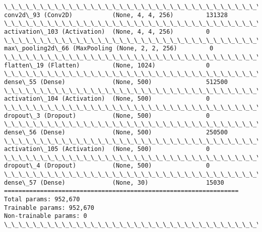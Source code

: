 \documentclass[11pt]{article}
\begin{document}
\begin{Verbatim}[commandchars=\\\{\}]
\_\_\_\_\_\_\_\_\_\_\_\_\_\_\_\_\_\_\_\_\_\_\_\_\_\_\_\_\_\_\_\_\_\_\_\_\_\_\_\_\_\_\_\_\_\_\_\_\_\_\_\_\_\_\_\_\_\_\_\_\_\_\_\_\_
conv2d\_93 (Conv2D)           (None, 4, 4, 256)         131328    
\_\_\_\_\_\_\_\_\_\_\_\_\_\_\_\_\_\_\_\_\_\_\_\_\_\_\_\_\_\_\_\_\_\_\_\_\_\_\_\_\_\_\_\_\_\_\_\_\_\_\_\_\_\_\_\_\_\_\_\_\_\_\_\_\_
activation\_103 (Activation)  (None, 4, 4, 256)         0         
\_\_\_\_\_\_\_\_\_\_\_\_\_\_\_\_\_\_\_\_\_\_\_\_\_\_\_\_\_\_\_\_\_\_\_\_\_\_\_\_\_\_\_\_\_\_\_\_\_\_\_\_\_\_\_\_\_\_\_\_\_\_\_\_\_
max\_pooling2d\_66 (MaxPooling (None, 2, 2, 256)         0         
\_\_\_\_\_\_\_\_\_\_\_\_\_\_\_\_\_\_\_\_\_\_\_\_\_\_\_\_\_\_\_\_\_\_\_\_\_\_\_\_\_\_\_\_\_\_\_\_\_\_\_\_\_\_\_\_\_\_\_\_\_\_\_\_\_
flatten\_19 (Flatten)         (None, 1024)              0         
\_\_\_\_\_\_\_\_\_\_\_\_\_\_\_\_\_\_\_\_\_\_\_\_\_\_\_\_\_\_\_\_\_\_\_\_\_\_\_\_\_\_\_\_\_\_\_\_\_\_\_\_\_\_\_\_\_\_\_\_\_\_\_\_\_
dense\_55 (Dense)             (None, 500)               512500    
\_\_\_\_\_\_\_\_\_\_\_\_\_\_\_\_\_\_\_\_\_\_\_\_\_\_\_\_\_\_\_\_\_\_\_\_\_\_\_\_\_\_\_\_\_\_\_\_\_\_\_\_\_\_\_\_\_\_\_\_\_\_\_\_\_
activation\_104 (Activation)  (None, 500)               0         
\_\_\_\_\_\_\_\_\_\_\_\_\_\_\_\_\_\_\_\_\_\_\_\_\_\_\_\_\_\_\_\_\_\_\_\_\_\_\_\_\_\_\_\_\_\_\_\_\_\_\_\_\_\_\_\_\_\_\_\_\_\_\_\_\_
dropout\_3 (Dropout)          (None, 500)               0         
\_\_\_\_\_\_\_\_\_\_\_\_\_\_\_\_\_\_\_\_\_\_\_\_\_\_\_\_\_\_\_\_\_\_\_\_\_\_\_\_\_\_\_\_\_\_\_\_\_\_\_\_\_\_\_\_\_\_\_\_\_\_\_\_\_
dense\_56 (Dense)             (None, 500)               250500    
\_\_\_\_\_\_\_\_\_\_\_\_\_\_\_\_\_\_\_\_\_\_\_\_\_\_\_\_\_\_\_\_\_\_\_\_\_\_\_\_\_\_\_\_\_\_\_\_\_\_\_\_\_\_\_\_\_\_\_\_\_\_\_\_\_
activation\_105 (Activation)  (None, 500)               0         
\_\_\_\_\_\_\_\_\_\_\_\_\_\_\_\_\_\_\_\_\_\_\_\_\_\_\_\_\_\_\_\_\_\_\_\_\_\_\_\_\_\_\_\_\_\_\_\_\_\_\_\_\_\_\_\_\_\_\_\_\_\_\_\_\_
dropout\_4 (Dropout)          (None, 500)               0         
\_\_\_\_\_\_\_\_\_\_\_\_\_\_\_\_\_\_\_\_\_\_\_\_\_\_\_\_\_\_\_\_\_\_\_\_\_\_\_\_\_\_\_\_\_\_\_\_\_\_\_\_\_\_\_\_\_\_\_\_\_\_\_\_\_
dense\_57 (Dense)             (None, 30)                15030     
=================================================================
Total params: 952,670
Trainable params: 952,670
Non-trainable params: 0
\_\_\_\_\_\_\_\_\_\_\_\_\_\_\_\_\_\_\_\_\_\_\_\_\_\_\_\_\_\_\_\_\_\_\_\_\_\_\_\_\_\_\_\_\_\_\_\_\_\_\_\_\_\_\_\_\_\_\_\_\_\_\_\_\_

    \end{Verbatim}
\end{document}
